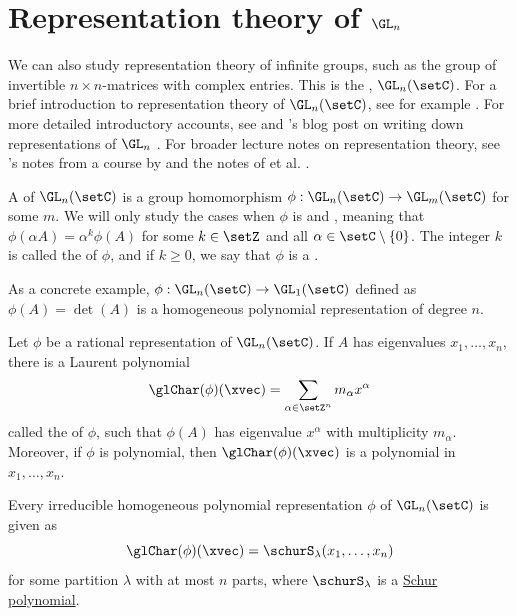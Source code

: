 \section[representationGln]{Representation theory of $\GL_n$}

We can also study representation theory of infinite groups,
such as the group of invertible $n\times n$-matrices with complex entries.
This is the \label{generalLinearGroup},
$\GL_n(\setC)$.
For a brief introduction to representation
theory of $\GL_n(\setC)$, see for example \cite[Chap.~7, App.~2]{StanleyEC2}.
For more detailed introductory accounts, see
\cite{Kamnitzer2009x} and
's blog post on writing down representations of
$\GL_n$ \cite{Speyer2008GLnRepresentations}.
For broader lecture notes on representation theory, see
's notes from a course by 
\cite{Rosen2012RepresentationTheoryNotes} and the notes of
 et al. \cite{EtingofEtAl2011RepresentationTheory}.


A \label{glRepresentation} of $\GL_n(\setC)$ is
a group homomorphism $\phi : \GL_n(\setC) \to \GL_m(\setC)$ for some $m$.
We will only study the cases when $\phi$ is
\label{homogeneousRepresentation}
and \label{rationalRepresentation},
meaning that $\phi(\alpha A) = \alpha^k \phi(A)$
for some $k \in \setZ$ and all $\alpha \in \setC \setminus \{0\}$.
The integer $k$ is called the \label{representationDegree}
of $\phi$, and if $k\geq 0$, we say that $\phi$ is a
\label{polynomialRepresentation}.

As a concrete example, $\phi : \GL_n(\setC) \to \GL_1(\setC)$ defined as
$\phi(A) = \det(A)$ is a homogeneous polynomial representation of degree $n$.


Let $\phi$ be a rational representation of $\GL_n(\setC)$.
If $A$ has eigenvalues $x_1,\dotsc,x_n$, there is a Laurent polynomial
\[
\glChar(\phi)(\xvec) = \sum_{\alpha \in \setZ^n} m_\alpha x^\alpha
\]
called the \label{glCharacter} of $\phi$,
such that $\phi(A)$ has eigenvalue $x^\alpha$ with multiplicity $m_\alpha$.
Moreover, if $\phi$ is polynomial, then $\glChar(\phi)(\xvec)$ is a polynomial
in $x_1,\dotsc,x_n$.



\begin{theorem}
Every irreducible homogeneous polynomial representation $\phi$ of $\GL_n(\setC)$
is given as
\[
\glChar(\phi)(\xvec) = \schurS_\lambda(x_1,\dotsc,x_n)
\]
for some partition $\lambda$ with at most $n$ parts, where
$\schurS_\lambda$ is a \hyperref[schurS]{Schur polynomial}.
\end{theorem}

